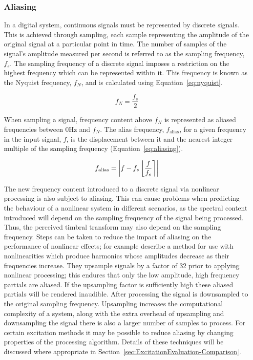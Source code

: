 		\subsubsection*{Aliasing}
			In a digital system, continuous signals must be represented by discrete signals. This is achieved
			through sampling, each sample representing the amplitude of the original signal at a particular
			point in time. The number of samples of the signal's amplitude measured per second is referred to
			as the sampling frequency, $f_{s}$. The sampling frequency of a discrete signal imposes a
			restriction on the highest frequency which can be represented within it. This frequency is known as
			the Nyquist frequency, $f_{N}$, and is calculated using Equation~\ref{eq:nyquist}.

			\begin{equation}
				f_{N} = \frac{f_{s}}{2}
				\label{eq:nyquist}
			\end{equation}

			When sampling a signal, frequency content above $f_{N}$ is represented as aliased frequencies
			between 0Hz and $f_{N}$. The alias frequency, $f_{\mathrm{alias}}$, for a given frequency in the
			input signal, $f$, is the displacement between it and the nearest integer multiple of the sampling
			frequency (Equation~\ref{eq:aliasing}).

			\begin{equation}
				f_{\mathrm{alias}} = \left|f - f_{s}\left\lfloor\frac{f}{f_{s}}\right\rceil\right|
				\label{eq:aliasing}
			\end{equation}

			The new frequency content introduced to a discrete signal via nonlinear processing is also subject
			to aliasing. This can cause problems when predicting the behaviour of a nonlinear system in
			different scenarios, as the spectral content introduced will depend on the sampling frequency of
			the signal being processed. Thus, the perceived timbral transform may also depend on the sampling
			frequency. Steps can be taken to reduce the impact of aliasing on the performance of nonlinear
			effects; for example \citep{vetter2013estimation} describe a method for use with nonlinearities
			which produce harmonics whose amplitudes decrease as their frequencies increase. They upsample
			signals by a factor of 32 prior to applying nonlinear processing; this endures that only the low
			amplitude, high frequency partials are aliased. If the upsampling factor is sufficiently high these
			aliased partials will be rendered inaudible. After processing the signal is downsampled to the
			original sampling frequency. Upsampling increases the computational complexity of a system, along
			with the extra overhead of upsampling and downsampling the signal there is also a larger number of
			samples to process. For certain excitation methods it may be possible to reduce aliasing by
			changing properties of the processing algorithm. Details of these techniques will be discussed
			where appropriate in Section~\ref{sec:ExcitationEvaluation-Comparison}.

